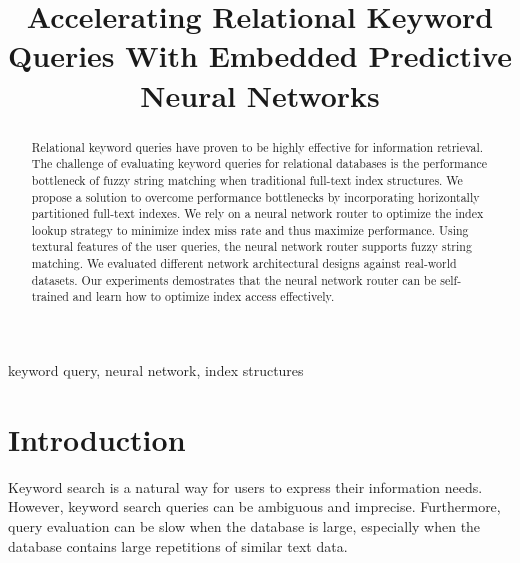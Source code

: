 \documentclass[conference]{IEEEtran}
\begin{document}
\title{
Accelerating Relational Keyword Queries With Embedded Predictive Neural Networks
}

\author{
\and
{}
}


\maketitle

\begin{abstract}
Relational keyword queries have proven to be highly effective for
information retrieval.  The challenge of evaluating keyword queries for
relational databases is the performance bottleneck of fuzzy string
matching when traditional full-text index structures.  We propose a
solution to overcome performance bottlenecks by incorporating
horizontally partitioned full-text indexes.  We rely on a neural
network router to optimize the index lookup strategy to minimize index
miss rate and thus maximize performance.  Using textural features of
the user queries, the neural network router supports fuzzy string
matching.  We evaluated different network architectural designs against
real-world datasets.  Our experiments demostrates that the neural
network router can be self-trained and learn how to optimize index
access effectively.
\end{abstract}

\begin{IEEEkeywords}
keyword query, neural network, index structures
\end{IEEEkeywords}

\section{Introduction}
Keyword search is a natural way for users to express their information needs. However, keyword search queries can be ambiguous and imprecise.  Furthermore, query evaluation can be slow when the database is large, especially when the database contains large repetitions of similar text data.
\end{document}
